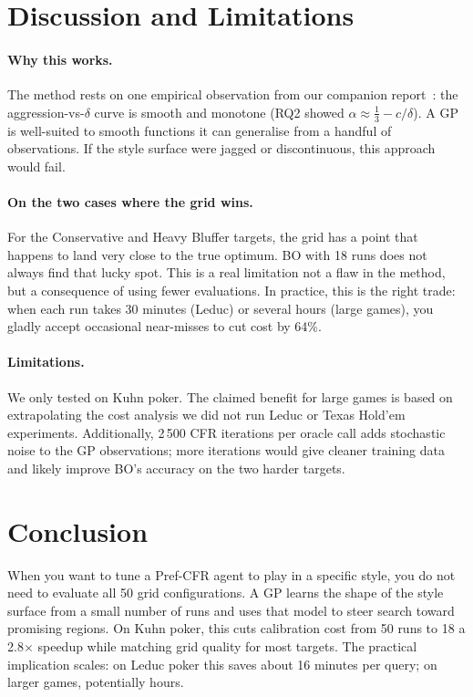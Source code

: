 \documentclass{article}
\begin{document}
\section{Discussion and Limitations}
\label{sec:discussion}

\paragraph{Why this works.}
The method rests on one empirical observation from our companion
report~\cite{sayed2025prefcfr}: the aggression-vs-$\delta$ curve is smooth and
monotone (RQ2 showed $\alpha \approx \tfrac{1}{3} - c/\delta$).  A GP is
well-suited to smooth functions it can generalise from a handful of
observations.  If the style surface were jagged or discontinuous, this approach
would fail.

\paragraph{On the two cases where the grid wins.}
For the Conservative and Heavy Bluffer targets, the grid has a point that
happens to land very close to the true optimum.  BO with 18 runs does not
always find that lucky spot.  This is a real limitation not a flaw in the
method, but a consequence of using fewer evaluations.  In practice, this is
the right trade: when each run takes 30 minutes (Leduc) or several hours
(large games), you gladly accept occasional near-misses to cut cost by 64\%.

\paragraph{Limitations.}
We only tested on Kuhn poker.  The claimed benefit for large games is based on
extrapolating the cost analysis we did not run Leduc or Texas Hold'em
experiments.  Additionally, 2\,500 CFR iterations per oracle call adds
stochastic noise to the GP observations; more iterations would give cleaner
training data and likely improve BO's accuracy on the two harder targets.

\section{Conclusion}
\label{sec:conclusion}

When you want to tune a Pref-CFR agent to play in a specific style, you do
not need to evaluate all 50 grid configurations.  A GP learns the shape of
the style surface from a small number of runs and uses that model to steer
search toward promising regions.  On Kuhn poker, this cuts calibration cost
from 50 runs to 18 a 2.8$\times$ speedup while matching grid quality for
most targets.  The practical implication scales: on Leduc poker this saves
about 16 minutes per query; on larger games, potentially hours.
\end{document}
